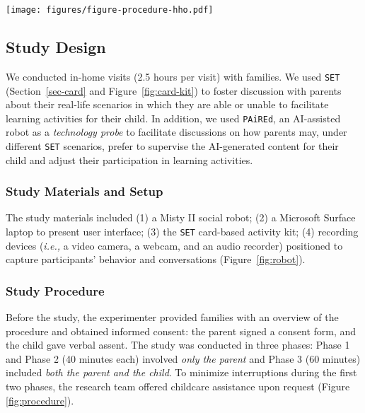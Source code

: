 \begin{figure*}[b!]
  \texttt{[image: figures/figure-procedure-hho.pdf]}
   \vspace{-6pt}
  \caption{Three-phase study procedure. Phase 1 (40 min) and Phase 2 (40 min) only involved the parent, and Phase 3 (60 min) involved both the parent and the child. }
  \label{fig:procedure}
   \vspace{-6pt}
\end{figure*}

\subsection{Study Design} 
We conducted in-home visits (2.5 hours per visit) with families. We used \texttt{SET} (Section~\ref{sec-card} and Figure~\ref{fig:card-kit}) to foster discussion with parents about their real-life scenarios in which they are able or unable to facilitate learning activities for their child. In addition, we used \texttt{PAiREd}, an AI-assisted robot as a \textit{technology probe} \cite{hutchinson2003technology} to facilitate discussions on how parents may, under different \texttt{SET} scenarios, prefer to supervise the AI-generated content for their child and adjust their participation in learning activities.

\subsubsection{Study Materials and Setup}
The study materials included (1) a Misty II social robot; (2) a Microsoft Surface laptop to present user interface; (3) the \texttt{SET} card-based activity kit; (4) recording devices (\textit{i.e.,} a video camera, a webcam, and an audio recorder) positioned to capture participants' behavior and conversations (Figure~\ref{fig:robot}). 

\subsubsection{Study Procedure} \label{sec-procedure} 
Before the study, the experimenter provided families with an overview of the procedure and obtained informed consent: the parent signed a consent form, and the child gave verbal assent. The study was conducted in three phases: Phase 1 and Phase 2 (40 minutes each) involved \textit{only the parent} and Phase 3 (60 minutes) included \textit{both the parent and the child}. To minimize interruptions during the first two phases, the research team offered childcare assistance upon request (Figure \ref{fig:procedure}).

